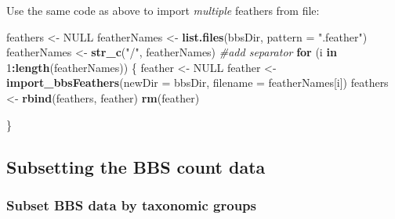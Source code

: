 \documentclass[12pt,twoside,openany]{reedthesis}
\newenvironment{Shaded}{\begin{snugshade}}{\end{snugshade}}
\newcommand{\CommentTok}[1]{\textcolor[rgb]{0.56,0.35,0.01}{\textit{#1}}}
\newcommand{\ControlFlowTok}[1]{\textcolor[rgb]{0.13,0.29,0.53}{\textbf{#1}}}
\newcommand{\DataTypeTok}[1]{\textcolor[rgb]{0.13,0.29,0.53}{#1}}
\newcommand{\DecValTok}[1]{\textcolor[rgb]{0.00,0.00,0.81}{#1}}
\newcommand{\KeywordTok}[1]{\textcolor[rgb]{0.13,0.29,0.53}{\textbf{#1}}}
\newcommand{\NormalTok}[1]{#1}
\newcommand{\OperatorTok}[1]{\textcolor[rgb]{0.81,0.36,0.00}{\textbf{#1}}}
\newcommand{\OtherTok}[1]{\textcolor[rgb]{0.56,0.35,0.01}{#1}}
\newcommand{\StringTok}[1]{\textcolor[rgb]{0.31,0.60,0.02}{#1}}
\begin{document}
Use the same code as above to import \emph{multiple} feathers from file:
\begin{Shaded}
\begin{Highlighting}[]
\NormalTok{feathers <-}\StringTok{ }\OtherTok{NULL}
\NormalTok{featherNames <-}\StringTok{ }\KeywordTok{list.files}\NormalTok{(bbsDir, }\DataTypeTok{pattern =} \StringTok{".feather"}\NormalTok{)}
\NormalTok{featherNames <-}\StringTok{ }\KeywordTok{str_c}\NormalTok{(}\StringTok{"/"}\NormalTok{, featherNames) }\CommentTok{#add separator}
\ControlFlowTok{for}\NormalTok{ (i }\ControlFlowTok{in} \DecValTok{1}\OperatorTok{:}\KeywordTok{length}\NormalTok{(featherNames)) \{}
\NormalTok{  feather <-}\StringTok{ }\OtherTok{NULL}
\NormalTok{  feather <-}\StringTok{ }\KeywordTok{import_bbsFeathers}\NormalTok{(}\DataTypeTok{newDir  =}\NormalTok{ bbsDir,}
                              \DataTypeTok{filename =}\NormalTok{ featherNames[i])}
\NormalTok{  feathers <-}\StringTok{ }\KeywordTok{rbind}\NormalTok{(feathers, feather)}
  \KeywordTok{rm}\NormalTok{(feather)}

\NormalTok{\}}
\end{Highlighting}
\end{Shaded}
\hypertarget{subsetting-the-bbs-count-data}{%
\subsection{Subsetting the BBS count data}\label{subsetting-the-bbs-count-data}}

\hypertarget{subset-bbs-data-by-taxonomic-groups}{%
\subsubsection{Subset BBS data by taxonomic groups}\label{subset-bbs-data-by-taxonomic-groups}}
\end{document}
